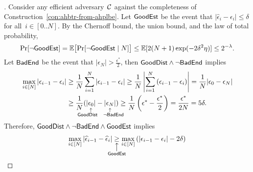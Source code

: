 \begin{proof}[]
Consider any efficient adversary~${\mathcal{C}}$ against the completeness of Construction~\ref{con:ahbtr-from-ahplbe}.
Let $\GoodEst$ be the event that ${|\widehat{\epsilon}_i-\epsilon_i|\leq\delta}$ for all~${i\in[0..N]}$.
By the Chernoff bound, the union bound, and the law of total probability,
\begin{align*}
\Pr[\neg\GoodEst]
=\E\bigl[\Pr[\neg\GoodEst\mid N]\bigr]
\leq\E[2({N+1})\exp({-2\delta^2\eta})]
\leq 2^{-\lambda}.
\end{align*}
Let $\BadEnd$ be the event that ${|\epsilon_N|>\frac{\epsilon^\ast}{2}}$,
then ${\GoodDist\wedge\neg\BadEnd}$ implies
\begin{align*}
\max_{i\in[N]}{|\epsilon_{i-1}-\epsilon_i|}
&{}\geq
\frac1N\sum_{i=1}^{N}{|\epsilon_{i-1}-\epsilon_i|}
\geq
\frac1N\left|\sum_{i=1}^{N}{(\epsilon_{i-1}-\epsilon_i)}\right|
=
\frac1N|\epsilon_0-\epsilon_N|
\\&{}\geq
\frac1N(
\underset{\mathclap{\substack{\uparrow\\{\GoodDist}\quad\vphantom{G}}}}{|\epsilon_0|}
-
\underset{\mathclap{\substack{\uparrow\\\quad{\neg\BadEnd}\vphantom{G}}}}{|\epsilon_N|}
)
\geq
\frac1N\left(
\epsilon^\ast
-\frac{\epsilon^\ast}{2}
\right)
=
\frac{\epsilon^\ast}{2N}
=
5\delta.
\end{align*}
Therefore, ${\GoodDist\wedge\neg\BadEnd\wedge\GoodEst}$ implies
\begin{align*}
\max_{i\in[N]}{|\widehat{\epsilon}_{i-1}-\widehat{\epsilon}_i|}
\underset{\mathclap{\substack{
\big\uparrow\\\GoodEst\vphantom{G}
}}}{\geq}
\max_{i\in[N]}{(|\epsilon_{i-1}-\epsilon_i|-2\delta)}

\end{align*}
\end{proof}
